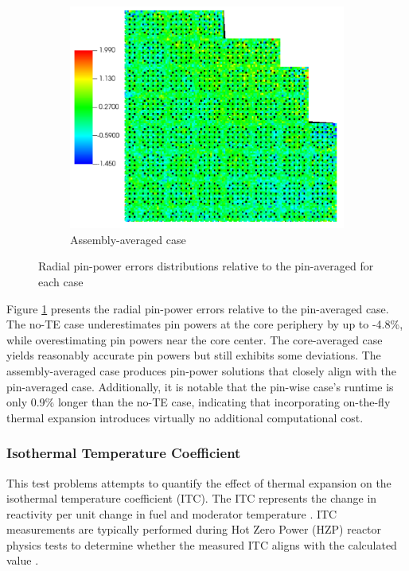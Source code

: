 \begin{figure}
\begin{subfigure}[b]{0.5\textwidth}
        \centering
        \includegraphics[width=\textwidth]{figs/pin_error_assembly.pdf}
        \caption{Assembly-averaged case}
    \end{subfigure}
    \caption[Radial pin-power errors distributions relative to the pin-averaged case]{Radial pin-power errors distributions relative to the pin-averaged for each case}
    \label{fig_421}
\end{figure}

Figure \ref{fig_421} presents the radial pin-power errors relative to the pin-averaged case. The no-TE case underestimates pin powers at the core periphery by up to -4.8\%, while overestimating pin powers near the core center. The core-averaged case yields reasonably accurate pin powers but still exhibits some deviations. The assembly-averaged case produces pin-power solutions that closely align with the pin-averaged case. Additionally, it is notable that the pin-wise case's runtime is only 0.9\% longer than the no-TE case, indicating that incorporating on-the-fly thermal expansion introduces virtually no additional computational cost.

\subsubsection{Isothermal Temperature Coefficient}

This test problems attempts to quantify the effect of thermal expansion on the isothermal temperature coefficient (ITC). The ITC represents the change in reactivity per unit change in fuel and moderator temperature \cite{ansi}. ITC measurements are typically performed during Hot Zero Power (HZP) reactor physics tests to determine whether the measured ITC aligns with the calculated value \cite{hong}.

